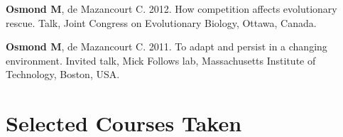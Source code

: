 \documentclass[12pt]{article}
\begin{document}

\textbf{Osmond M}, de Mazancourt C. 2012. How competition affects evolutionary rescue. Talk, Joint Congress on Evolutionary Biology, Ottawa, Canada.


\textbf{Osmond M}, de Mazancourt C. 2011. To adapt and persist in a changing environment. Invited talk, Mick Follows lab, Massachusetts Institute of Technology, Boston, USA.









\section*{Selected Courses Taken}
\end{document}
